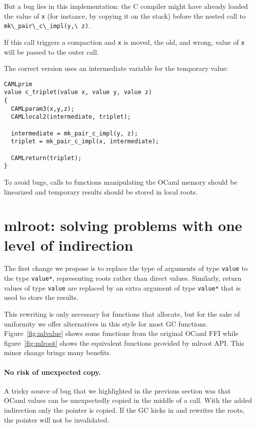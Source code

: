 \documentclass[a4paper]{easychair}
\newcommand{\cpp}[1]{\lstinline[style=C++]{#1}}
\begin{document}
But a bug lies in this implementation: the C compiler might have already
loaded the value of \cpp{x} (for instance, by copying it on the
stack) before the nested call to \cpp{mk\_pair\_c\_impl(y,\ z)}.

If this call triggers a compaction and \cpp{x} is moved, the old,
and wrong, value of \cpp{x} will be passed to the outer call.

The correct version uses an intermediate variable for the temporary
value:
%
\begin{lstlisting}[style=C++]
CAMLprim
value c_triplet(value x, value y, value z)
{
  CAMLparam3(x,y,z);
  CAMLlocal2(intermediate, triplet);

  intermediate = mk_pair_c_impl(y, z);
  triplet = mk_pair_c_impl(x, intermediate);

  CAMLreturn(triplet);
}
\end{lstlisting}

To avoid bugs, calls to functions manipulating the OCaml memory should be
linearized and temporary results should be stored in local roots.

\section{mlroot: solving problems with one level of indirection}

The first change we propose is to replace the type of arguments of type \cpp{value}
to the type \cpp{value*}, representing roots rather than direct values.
Similarly, return values of type \cpp{value} are replaced by an extra argument
of type \cpp{value*} that is used to store the results.

This rewriting is only necessary for functions that allocate, but for the sake
of uniformity we offer alternatives in this style for most GC functions.
Figure~\ref{fig:mlvalue} shows some functions from the original OCaml FFI while
figure~\ref{fig:mlroot} shows the equivalent functions provided by mlroot API.
This minor change brings many benefits.

\paragraph{No risk of unexpected copy.}

A tricky source of bug that we highlighted in the previous section was
that OCaml values can be unexpectedly copied in the middle of a call. With
the added indirection only the pointer is copied. If the GC kicks in and
rewrites the roots, the pointer will not be invalidated.
\end{document}
